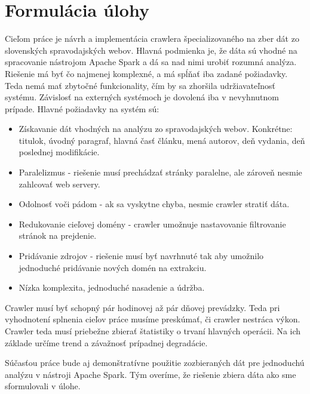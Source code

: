 \chapter*{Formulácia úlohy}


Cieľom práce je návrh a implementácia crawlera špecializovaného na zber dát zo slovenských spravodajských webov. Hlavná podmienka je, že dáta sú vhodné na spracovanie nástrojom Apache Spark a dá sa nad nimi urobiť rozumná analýza. Riešenie má byť čo najmenej komplexné, a má spĺňať iba zadané požiadavky. Teda nemá mať zbytočné funkcionality, čím by sa zhoršila udržiavateľnosť systému. Závislosť na externých systémoch je dovolená iba v nevyhnutnom prípade. Hlavné požiadavky na systém sú: 

\begin{itemize}
    \item Získavanie dát vhodných na analýzu zo spravodajských webov. Konkrétne: titulok, úvodný paragraf, hlavná časť článku, mená autorov, deň vydania, deň poslednej modifikácie.
    \item Paralelizmus - riešenie musí prechádzať stránky paralelne, ale zároveň nesmie zahlcovať web servery.
    \item Odolnosť voči pádom - ak sa vyskytne chyba, nesmie crawler stratiť dáta.
    \item Redukovanie cieľovej domény - crawler umožnuje nastavovanie filtrovanie stránok na prejdenie.
    \item Pridávanie zdrojov - riešenie musí byť navrhnuté tak aby umožnilo jednoduché pridávanie nových domén na extrakciu. 
    \item Nízka komplexita, jednoduché nasadenie a údržba. 
\end{itemize}


Crawler musí byť schopný pár hodinovej až pár dňovej prevádzky. Teda pri vyhodnotení splnenia cieľov práce musíme preskúmať, či crawler nestráca výkon. Crawler teda musí priebežne zbierať štatistiky o trvaní hlavných operácii. Na ich základe určíme trend a závažnosť prípadnej degradácie. 

Súčasťou práce bude aj demonštratívne použitie zozbieraných dát pre jednoduchú analýzu v nástroji Apache Spark. Tým overíme, že riešenie zbiera dáta ako sme sformulovali v úlohe.